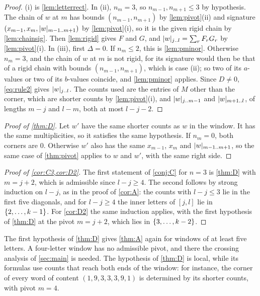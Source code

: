 \documentclass[11pt,a4paper]{article}
\begin{document}
\begin{proof}
(i) is \cref{lem:letterrect}. In (ii), $n_m=3$, so $n_{m-1},n_{m+1}\le3$ by hypothesis. The chain of $w$ at $m$ has bounds $(n_{m-1},n_{m+1})$ by \cref{lem:pivot}(ii) and signature $(x_{m-1},x_m,\lvert w\rvert_{m-1\mathinner{\ldotp\ldotp} m+1})$ by \cref{lem:pivot}(i), so it is the given rigid chain by \cref{lem:chainsig}. Then \cref{lem:rigid} gives $F$ and $G$, and $\lvert w\rvert_{j\mathinner{\ldotp\ldotp} l}=\sum_rF_rG_r$ by \cref{lem:pivot}(i). In (iii), first $\Delta=0$. If $n_m\le2$, this is \cref{lem:pminor}. Otherwise $n_m=3$, and the chain of $w$ at $m$ is not rigid, for its signature would then be that of a rigid chain with bounds $(n_{m-1},n_{m+1})$, which is case (ii); so two of its $a$-values or two of its $b$-values coincide, and \cref{lem:pminor} applies. Since $D\ne0$, \eqref{eq:rule2} gives $\lvert w\rvert_{j\mathinner{\ldotp\ldotp} l}$. The counts used are the entries of $M$ other than the corner, which are shorter counts by \cref{lem:pivot}(i), and $\lvert w\rvert_{j\mathinner{\ldotp\ldotp} m-1}$ and $\lvert w\rvert_{m+1\mathinner{\ldotp\ldotp} l}$, of lengths $m-j$ and $l-m$, both at most $l-j-2$.
\end{proof}

\begin{proof}[Proof of \cref{thm:D}]
Let $w'$ have the same shorter counts as $w$ in the window. It has the same multiplicities, so it satisfies the same hypothesis. If $n_m=0$, both corners are $0$. Otherwise $w'$ also has the same $x_{m-1}$, $x_m$ and $\lvert w\rvert_{m-1\mathinner{\ldotp\ldotp} m+1}$, so the same case of \cref{thm:pivot} applies to $w$ and $w'$, with the same right side.
\end{proof}

\begin{proof}[Proof of \cref{cor:C3,cor:D2}]
The first statement of \cref{conj:C} for $n=3$ is \cref{thm:D} with $m=j+2$, which is admissible since $l-j\ge4$. The second follows by strong induction on $l-j$, as in the proof of \cref{cor:A}: the counts with $l-j\le3$ lie in the first five diagonals, and for $l-j\ge4$ the inner letters of $[j,l]$ lie in $\{2,\ldots,k-1\}$. For \cref{cor:D2} the same induction applies, with the first hypothesis of \cref{thm:D} at the pivot $m=j+2$, which lies in $\{3,\ldots,k-2\}$.
\end{proof}

The first hypothesis of \cref{thm:D} gives \cref{thm:A} again for windows of at least five letters. A four-letter window has no admissible pivot, and there the crossing analysis of \cref{sec:main} is needed. The hypothesis of \cref{thm:D} is local, while its formulas use counts that reach both ends of the window: for instance, the corner of every word of content $(1,9,3,3,3,9,1)$ is determined by its shorter counts, with pivot $m=4$.
\end{document}
